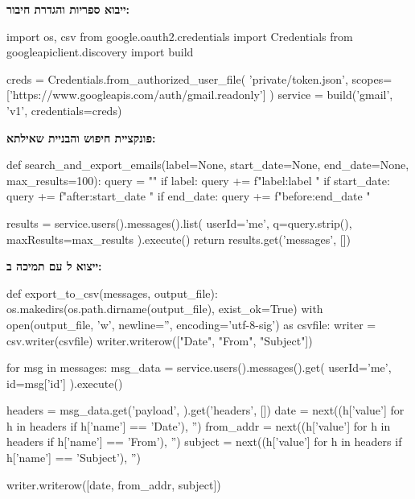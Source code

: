 
\textbf{ייבוא ספריות והגדרת חיבור:}

\begin{pythonbox}
import os, csv
from google.oauth2.credentials import Credentials
from googleapiclient.discovery import build

creds = Credentials.from_authorized_user_file(
    'private/token.json',
    scopes=['https://www.googleapis.com/auth/gmail.readonly']
)
service = build('gmail', 'v1', credentials=creds)
\end{pythonbox}

\textbf{פונקציית חיפוש והבניית שאילתא:}

\begin{pythonbox}
def search_and_export_emails(label=None, start_date=None,
                              end_date=None, max_results=100):
    query = ""
    if label:
        query += f"label:{label} "
    if start_date:
        query += f"after:{start_date} "
    if end_date:
        query += f"before:{end_date} "

    results = service.users().messages().list(
        userId='me', q=query.strip(),
        maxResults=max_results
    ).execute()
    return results.get('messages', [])
\end{pythonbox}

\textbf{ייצוא ל עם תמיכה ב:}

\begin{pythonbox}
def export_to_csv(messages, output_file):
    os.makedirs(os.path.dirname(output_file), exist_ok=True)
    with open(output_file, 'w', newline='',
              encoding='utf-8-sig') as csvfile:
        writer = csv.writer(csvfile)
        writer.writerow(["Date", "From", "Subject"])

        for msg in messages:
            msg_data = service.users().messages().get(
                userId='me', id=msg['id']
            ).execute()

            headers = msg_data.get('payload', {}).get('headers', [])
            date = next((h['value'] for h in headers if h['name'] == 'Date'), '')
            from_addr = next((h['value'] for h in headers if h['name'] == 'From'), '')
            subject = next((h['value'] for h in headers if h['name'] == 'Subject'), '')

            writer.writerow([date, from_addr, subject])
\end{pythonbox}
